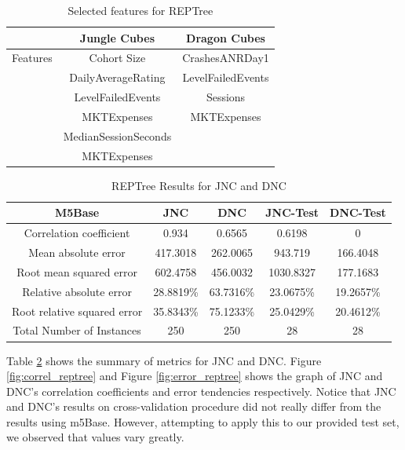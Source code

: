 \begin{table}[h]
\centering
\caption{Selected features for REPTree}
\label{table:reptree_features}
\begin{tabular}{|c|c|c|}
\hline 
 & Jungle Cubes & Dragon Cubes\\ 
\hline 
Features & Cohort Size & CrashesANRDay1 
\\& DailyAverageRating & LevelFailedEvents 
\\& LevelFailedEvents & Sessions
\\& MKTExpenses & MKTExpenses
\\& MedianSessionSeconds &  
\\& MKTExpenses &  
\\ 
\hline 
\end{tabular}
\end{table}

\begin{table}[h]
\centering
\caption{REPTree Results for JNC and DNC}
\label{table:reptree_results}
\begin{tabular}{|c|c|c|c|c|}
\hline 
M5Base & JNC & DNC & JNC-Test & DNC-Test \\ 
\hline 
Correlation coefficient & 0.934 & 0.6565 & 0.6198 & 0
\\Mean absolute error & 417.3018 & 262.0065 & 943.719 & 166.4048
\\Root mean squared error & 602.4758 &  456.0032 & 1030.8327 & 177.1683
\\Relative absolute error &28.8819\% & 63.7316\% & 23.0675\% & 19.2657\%
\\Root relative squared error  & 35.8343\% & 75.1233\% & 25.0429\% & 20.4612\% 
\\Total Number of Instances & 250 & 250 & 28 & 28
\\
\hline 
\end{tabular}
\end{table}

Table \ref{table:reptree_results} shows the summary of metrics for JNC and DNC. Figure \ref{fig:correl_reptree} and Figure \ref{fig:error_reptree} shows the graph of JNC and DNC's correlation coefficients and error tendencies respectively. Notice that JNC and DNC's results on cross-validation procedure did not really differ from the results using m5Base. However, attempting to apply this to our provided test set, we observed that values vary greatly.

